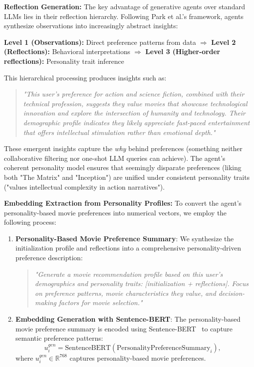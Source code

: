 \documentclass[acmsmall]{acmart}
\begin{document}
\textbf{Reflection Generation:} The key advantage of generative agents over standard LLMs lies in their reflection hierarchy. Following Park et al.'s framework, agents synthesize observations into increasingly abstract insights:

\textbf{Level 1 (Observations):} Direct preference patterns from data $\Rightarrow$
\textbf{Level 2 (Reflections):} Behavioral interpretations $\Rightarrow$ 
\textbf{Level 3 (Higher-order reflections):} Personality trait inference

This hierarchical processing produces insights such as:
\begin{quote}
\textit{"This user's preference for action and science fiction, combined with their technical profession, suggests they value movies that showcase technological innovation and explore the intersection of humanity and technology. Their demographic profile indicates they likely appreciate fast-paced entertainment that offers intellectual stimulation rather than emotional depth."}
\end{quote}

These emergent insights capture the \textit{why} behind preferences (something neither collaborative filtering nor one-shot LLM queries can achieve). The agent's coherent personality model ensures that seemingly disparate preferences (liking both "The Matrix" and "Inception") are unified under consistent personality traits ("values intellectual complexity in action narratives").

\textbf{Embedding Extraction from Personality Profiles:} To convert the agent's personality-based movie preferences into numerical vectors, we employ the following process:

\begin{enumerate}
    \item \textbf{Personality-Based Movie Preference Summary}: We synthesize the initialization profile and reflections into a comprehensive personality-driven preference description:
    \begin{quote}
    \textit{"Generate a movie recommendation profile based on this user's demographics and personality traits: [initialization + reflections]. Focus on preference patterns, movie characteristics they value, and decision-making factors for movie selection."}
    \end{quote}
    
    \item \textbf{Embedding Generation with Sentence-BERT}: The personality-based movie preference summary is encoded using Sentence-BERT~\cite{reimers2019sentence} to capture semantic preference patterns:
    \begin{equation}
    u^{gen}_i = \text{SentenceBERT}(\text{PersonalityPreferenceSummary}_i),    \label{eq:personality_encoding}
    \end{equation}
    where $u^{gen}_i\in \mathbb{R}^{768}$ captures personality-based movie preferences.
    

\end{enumerate}
\end{document}
